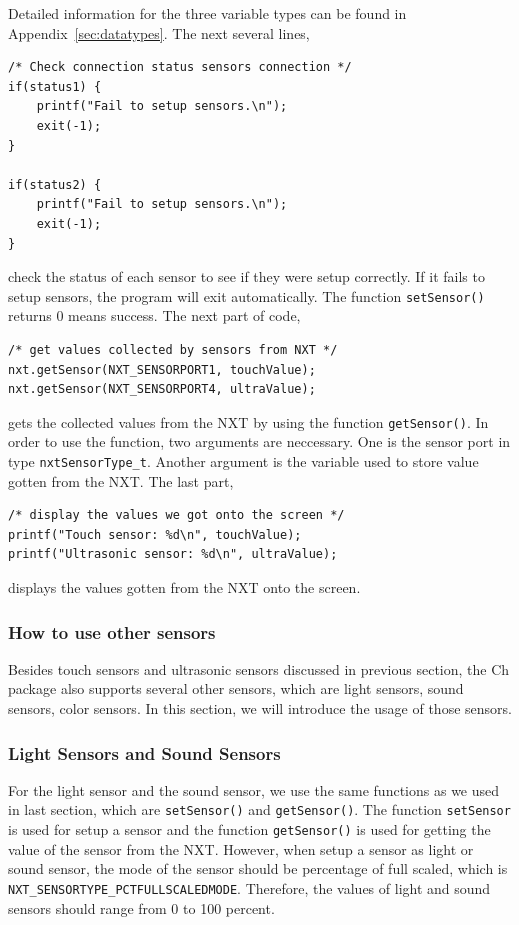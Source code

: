 \documentclass[11pt]{article}
\begin{document}
Detailed information for the three variable types can be found in Appendix~\ref{sec:datatypes}. 
The next several lines,
\begin{lstlisting}
/* Check connection status sensors connection */
if(status1) {
    printf("Fail to setup sensors.\n");
    exit(-1);
}

if(status2) {
    printf("Fail to setup sensors.\n");
    exit(-1);
}
\end{lstlisting}
check the status of each sensor to see if they were setup correctly. If it fails 
to setup sensors, the program will exit automatically. The function {\tt setSensor()} 
returns 0 means success. The next part of code,
\begin{lstlisting}
/* get values collected by sensors from NXT */
nxt.getSensor(NXT_SENSORPORT1, touchValue);
nxt.getSensor(NXT_SENSORPORT4, ultraValue);
\end{lstlisting}
gets the collected values from the NXT by using the function {\tt getSensor()}. 
In order to use the function, two arguments are neccessary. One is the sensor port 
in type {\tt nxtSensorType\_t}. Another argument is the variable used to store 
value gotten from the NXT. The last part,
\begin{lstlisting}
/* display the values we got onto the screen */
printf("Touch sensor: %d\n", touchValue);
printf("Ultrasonic sensor: %d\n", ultraValue);
\end{lstlisting}
displays the values gotten from the NXT onto the screen.

\subsubsection{How to use other sensors\label{sec:sensor_other}}
Besides touch sensors and ultrasonic sensors discussed in previous section, the 
Ch package also supports several other sensors, which are light sensors, sound
sensors, color sensors. In this section, we will introduce the usage of those
sensors.

\subsubsection*{Light Sensors and Sound Sensors}
For the light sensor and the sound sensor, we use the same functions as we used
in last section, which are {\tt setSensor()} and {\tt getSensor()}. The function
{\tt setSensor} is used for setup a sensor and the function {\tt getSensor()} is
used for getting the value of the sensor from the NXT. However, when setup a 
sensor as light or sound sensor, the mode of the sensor should be percentage of 
full scaled, which is {\tt NXT\_SENSORTYPE\_PCTFULLSCALEDMODE}. Therefore, the
values of light and sound sensors should range from 0 to 100 percent. \\
\end{document}
